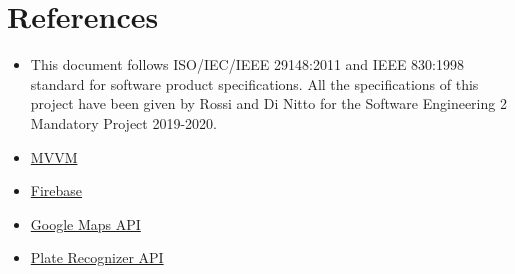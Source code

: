 \documentclass[../RASD.tex]{subfiles}
\begin{document}
\chapter{References}\label{ch:references}
    \begin{itemize}
        \item This document follows ISO/IEC/IEEE 29148:2011 and IEEE 830:1998 standard for software product specifications.
        All the specifications of this project have been given by Rossi and Di Nitto for the Software Engineering 2 Mandatory Project 2019-2020.
        \item \href{https://it.wikipedia.org/wiki/Model-view-viewmodel}{MVVM}
        \item \href{https://firebase.google.com/docs}{Firebase}
        \item \href{https://developers.google.com/maps/documentation/}{Google Maps API}
        \item \href{http://docs.platerecognizer.com/}{Plate Recognizer API}
    \end{itemize}
\end{document}
